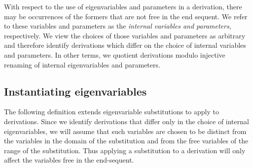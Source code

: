 \documentclass[preprint]{elsarticle}
\begin{document}
With respect to the use of eigenvariables and parameters in a
derivation, there may be occurrences of the formers that are not free
in the end sequent. We refer to these variables and parameters as the
\emph{internal variables and parameters}, respectively.  We view the
choices of those variables and parameters as arbitrary and therefore
identify derivations which differ on the choice of internal variables
and parameters. In other terms, we quotient derivations modulo
injective renaming of internal eigenvariables and parameters.

\subsection{Instantiating eigenvariables}
\label{sec:subst}

The following definition extends eigenvariable substitutions to apply
to derivations.  Since we identify derivations that differ only in the
choice of internal eigenvariables, we will assume that such variables
are chosen to be distinct from the variables in the domain of the
substitution and from the free variables of the range of the
substitution.  Thus applying a substitution to a derivation will only
affect the variables free in the end-sequent.
\end{document}
